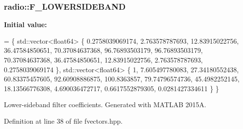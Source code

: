 \hypertarget{namespaceradio_a0ffd57d5a11ff70a1f55dbdc8ebe098d}{
\subsubsection[{F\+\_\+\+L\+O\+W\+E\+R\+S\+I\+D\+E\+B\+A\+N\+D}]{ radio\+::\+F\+\_\+\+L\+O\+W\+E\+R\+S\+I\+D\+E\+B\+A\+N\+D}}\label{namespaceradio_a0ffd57d5a11ff70a1f55dbdc8ebe098d}
{\bfseries Initial value\+:}
\begin{DoxyCode}
= \{ std::vector<float64> \{
        0.2758039069174,   
            2.763578787693,   
            12.83915022756,   
            36.47584850651,
            70.37084637368,   
            96.76893503179,   
            96.76893503179,   
            70.37084637368,
            36.47584850651,   
            12.83915022756,   
            2.763578787693,  
            0.2758039069174   
    \}, std::vector<float64> \{
        1,
            7.605497780083,   
            27.34180552438,   
            60.83375457605,
            92.60908886875,       
            100.8363857,    
            79.74796574736,     
            45.4982252145,
            18.13566776308,    
            4.690036472717,   
            0.6617552879305,   
            0.0281427334611
    \} \}
\end{DoxyCode}
Lower-\/sideband filter coefficients. Generated with M\+A\+T\+L\+A\+B 2015\+A. 

Definition at line 38 of file fvectors.\+hpp.

